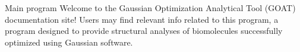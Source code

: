 Main program Welcome to the Gaussian Optimization Analytical Tool (GOAT) documentation site! Users may find relevant info related to this program, a program designed to provide structural analyses of biomolecules successfully optimized using Gaussian software. 
